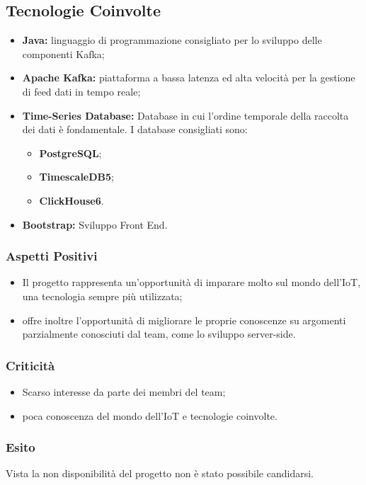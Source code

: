	\subsection{Tecnologie Coinvolte}
	\begin{itemize}
		\item \textbf{Java:} linguaggio di programmazione consigliato per lo sviluppo delle componenti Kafka; 
		\item \textbf{Apache Kafka:} piattaforma a bassa latenza ed alta velocità per la gestione di feed dati in tempo reale; 
		\item \textbf{Time-Series Database:} Database in cui l'ordine temporale della raccolta dei dati è fondamentale. I database consigliati sono:
			\begin{itemize}
			\item \textbf{PostgreSQL}; 
			\item \textbf{TimescaleDB5};
			\item \textbf{ClickHouse6}.
			\end{itemize}
		\item \textbf{Bootstrap:} Sviluppo Front End.
	\end{itemize}
	\subsubsection{Aspetti Positivi}
		\begin{itemize}
			\item Il progetto rappresenta un'opportunità di imparare molto sul mondo dell'IoT, una tecnologia sempre più utilizzata; 
			\item offre inoltre l'opportunità di migliorare le proprie conoscenze su argomenti parzialmente conosciuti dal team, come lo sviluppo server-side.
		\end{itemize} 
	\subsubsection{Criticità}
		\begin{itemize}
			\item Scarso interesse da parte dei membri del team; 
			\item poca conoscenza del mondo dell'IoT e tecnologie coinvolte.
		\end{itemize}
	\subsubsection{Esito}
	Vista la non disponibilità del progetto non è stato possibile candidarsi.
		
		